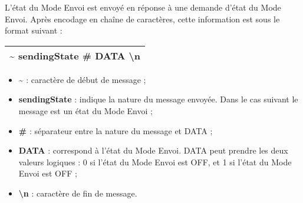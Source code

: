 L'état du Mode Envoi est envoyé en réponse à une demande d'état du Mode Envoi. Après encodage en chaîne de caractères, cette information est sous le format suivant :\\

\begin{minipage}
    \textwidth
    \centering
    \begin{tabular}{|c|}
        \hline
        \textasciitilde{} sendingState \# DATA \textbackslash n\\
        \hline
    \end{tabular}
\end{minipage}

\medspace

\begin{itemize}
    \item \textbf{\textasciitilde{}} : caractère de début de message ;
    \item \textbf{sendingState} : indique la nature du message envoyée. Dans le cas suivant le message est un état du Mode Envoi ;
    \item \textbf{\#} : séparateur entre la nature du message et DATA ;
    \item \textbf{DATA} : correspond à l'état du Mode Envoi. DATA peut prendre les deux valeurs logiques : 0 si l'état du Mode Envoi est OFF, et 1 si l'état du Mode Envoi est OFF ;
    \item \textbf{\textbackslash n} : caractère de fin de message.\\
\end{itemize}